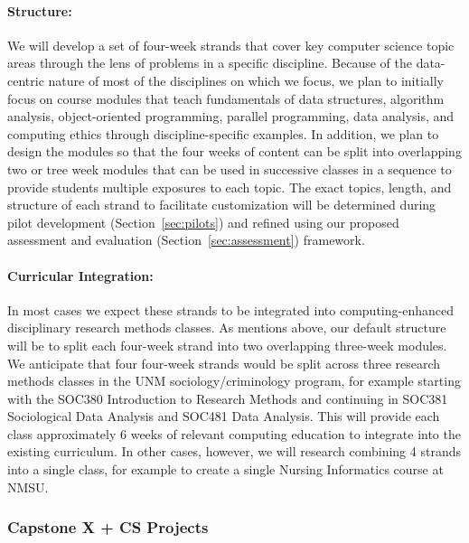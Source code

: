 \paragraph{Structure:} We will develop a set of four-week strands that cover key computer science topic areas through the lens of problems in a specific discipline. Because of the data-centric nature of most of the disciplines on which we focus, we plan to initially focus on course modules that teach fundamentals of data structures, algorithm analysis, object-oriented programming, parallel programming, data analysis, and computing ethics through discipline-specific examples. In addition, we plan to design the modules so that the four weeks of content can be split into overlapping two or tree week modules that can be used in successive classes in a sequence to provide students multiple exposures to each topic. The exact topics, length, and structure of each strand to facilitate customization will be determined during pilot development (Section~\ref{sec:pilots}) and refined using our proposed assessment and evaluation (Section~\ref{sec:assessment}) framework.

\paragraph{Curricular Integration:} In most cases we expect these strands to be integrated into computing-enhanced disciplinary research methods classes. As mentions above, our default structure will be to split each four-week strand into two overlapping three-week modules. We anticipate that four four-week strands would be split across three research methods classes in the UNM sociology/criminology program, for example starting with the SOC380 Introduction to Research Methods and continuing in SOC381 Sociological Data Analysis
 and SOC481 Data Analysis. This will provide each class approximately 6 weeks of relevant computing education to integrate into the existing curriculum. In other cases, however, we will research combining 4 strands into a single class, for example to create a single Nursing Informatics course at NMSU. 

\subsubsection{Capstone X + CS Projects}

